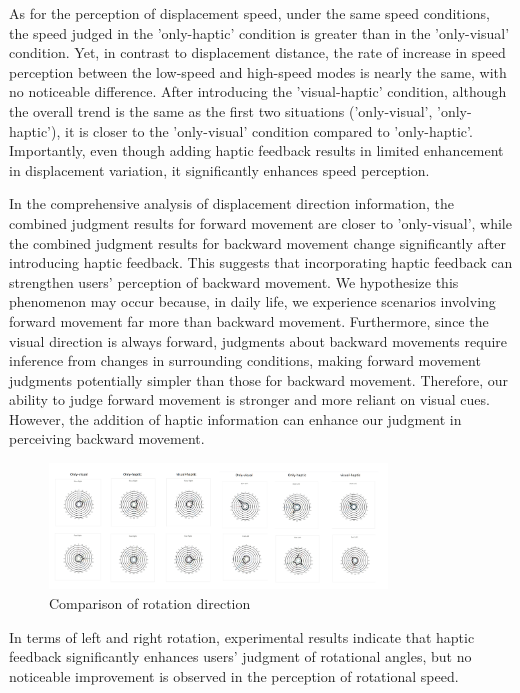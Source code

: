 As for the perception of displacement speed, under the same speed conditions, the speed judged in the 'only-haptic' condition is greater than in the 'only-visual' condition. Yet, in contrast to displacement distance, the rate of increase in speed perception between the low-speed and high-speed modes is nearly the same, with no noticeable difference. After introducing the 'visual-haptic' condition, although the overall trend is the same as the first two situations ('only-visual', 'only-haptic'), it is closer to the 'only-visual' condition compared to 'only-haptic'. Importantly, even though adding haptic feedback results in limited enhancement in displacement variation, it significantly enhances speed perception.

In the comprehensive analysis of displacement direction information, the combined judgment results for forward movement are closer to 'only-visual', while the combined judgment results for backward movement change significantly after introducing haptic feedback. This suggests that incorporating haptic feedback can strengthen users' perception of backward movement. We hypothesize this phenomenon may occur because, in daily life, we experience scenarios involving forward movement far more than backward movement. Furthermore, since the visual direction is always forward, judgments about backward movements require inference from changes in surrounding conditions, making forward movement judgments potentially simpler than those for backward movement. Therefore, our ability to judge forward movement is stronger and more reliant on visual cues. However, the addition of haptic information can enhance our judgment in perceiving backward movement.

\begin{figure}[h]
\centering
\includegraphics[width=0.8\textwidth]{A_thesis/figures/LeftandRight.png}
\caption{Comparison of rotation direction}
\end{figure}

In terms of left and right rotation, experimental results indicate that haptic feedback significantly enhances users' judgment of rotational angles, but no noticeable improvement is observed in the perception of rotational speed.

